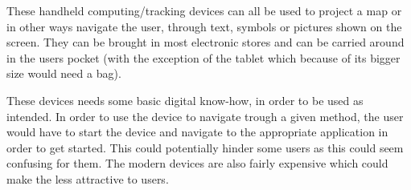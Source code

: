 These handheld computing/tracking devices can all be used to project a map or in other ways navigate the user, through text, symbols or pictures shown on the screen. They can be brought in most electronic stores and can be carried around in the users pocket (with the exception of the tablet which because of its bigger size would need a bag). 

These devices needs some basic digital know-how, in order to be used as intended. In order to use the device to navigate trough a given method, the user would have to start the device and navigate to the appropriate application in order to get started. This could potentially hinder some users as this could seem confusing for them. The modern devices are also fairly expensive which could make the less attractive to users.